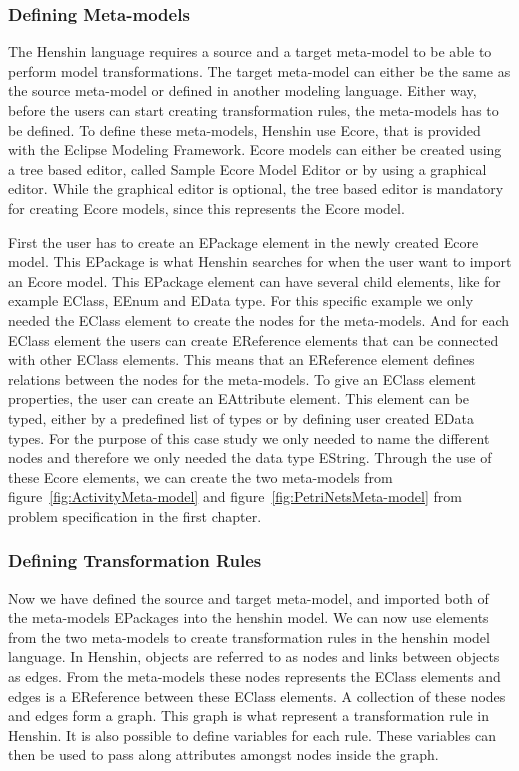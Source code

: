 \subsubsection*{Defining Meta-models}

The Henshin language requires a source and a target meta-model to be able to
perform model transformations. The target meta-model can either be the same as
the source meta-model or defined in another modeling language. Either way, before
the users can start creating transformation rules, the meta-models has
to be defined. To define these meta-models, Henshin use Ecore, that is
provided with the Eclipse Modeling Framework\cite{Steinberg2009}. Ecore models
can either be created using a tree based editor, called Sample Ecore Model
Editor or by using a graphical editor. While the graphical editor is optional,
the tree based editor is mandatory for creating Ecore models, since this
represents the Ecore model. 

First the user has to create an EPackage element in the newly created Ecore
model. This EPackage is what Henshin searches for when the user want to import
an Ecore model. This EPackage element can have several child elements, like for
example EClass, EEnum and EData type. For this specific example we only needed
the EClass element to create the nodes for the meta-models. And for each EClass
element the users can create EReference elements that can be connected with
other EClass elements. This means that an EReference element defines relations
between the nodes for the meta-models. To give an EClass element properties, the
user can create an EAttribute element. This element can be typed, either by a
predefined list of types or by defining user created EData types. For the
purpose of this case study we only needed to name the different nodes and
therefore we only needed the data type EString. Through the use of these Ecore
elements, we can create the two meta-models from
figure~\ref{fig:ActivityMeta-model} and figure~\ref{fig:PetriNetsMeta-model} from
problem specification in the first chapter.


\subsubsection*{Defining Transformation Rules}

Now we have defined the source and target meta-model, and imported
both of the meta-models EPackages into the henshin model. We can now use elements
from the two meta-models to create transformation rules in the henshin model
language. In Henshin, objects are referred to as nodes and links between objects
as edges. From the meta-models these nodes represents the EClass elements and
edges is a EReference between these EClass elements. A collection of these nodes
and edges form a graph. This graph is what represent a transformation rule in
Henshin. It is also possible to define variables for each rule. These variables
can then be used to pass along attributes amongst nodes inside the
graph. 

